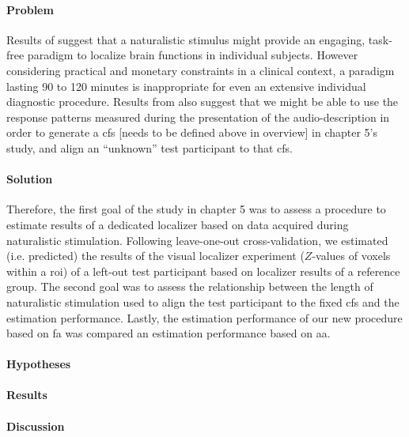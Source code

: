 




\paragraph{Problem}
Results of \citet{haeusler2022processing} suggest that a naturalistic stimulus
might provide an engaging, task-free paradigm to localize brain functions in
individual subjects.
%
However considering practical and monetary constraints in a clinical context, a
paradigm lasting 90 to 120 minutes is inappropriate for even an extensive
individual diagnostic procedure.
%
Results from \citet{haeusler2022processing} also suggest that we might be able
to use the response patterns measured during the presentation of the
audio-description in order to generate a \ac{cfs} [needs to be defined above in
overview] in chapter 5's study, and align an ``unknown'' test participant to
that \ac{cfs}.


\paragraph{Solution}
%
Therefore, the first goal of the study in chapter 5 was to assess a procedure to
estimate results of a dedicated localizer \citep{sengupta2016extension} based on
data acquired during naturalistic stimulation.
%
Following leave-one-out cross-validation, we estimated (i.e. predicted) the
results of the visual localizer experiment ($Z$-values of voxels within a
\ac{roi}) of a left-out test participant based on localizer results of a
reference group.
The second goal was to assess the relationship between the length of
naturalistic stimulation used to align the test participant to the fixed
\ac{cfs} and the estimation performance.
%
Lastly, the estimation performance of our new procedure based on \ac{fa} was
compared an estimation performance based on \ac{aa}.


\paragraph{Hypotheses}


\paragraph{Results}


\paragraph{Discussion}
